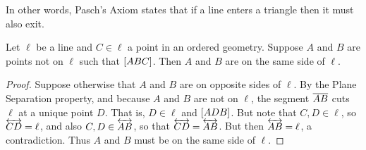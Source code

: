 In other words, Pasch's Axiom states that if a line enters a triangle then it must also exit.

\begin{lem}
Let \(\ell\) be a line and \(C \in \ell\) a point in an ordered geometry. Suppose \(A\) and \(B\) are points not on \(\ell\) such that \([ A B C ]\). Then \(A\) and \(B\) are on the same side of \(\ell\).
\end{lem}

\begin{proof}
Suppose otherwise that \(A\) and \(B\) are on opposite sides of \(\ell\). By the Plane Separation property, and because \(A\) and \(B\) are not on \(\ell\), the segment \(\overline{AB}\) cuts \(\ell\) at a unique point \(D\). That is, \(D \in \ell\) and \([ A D B ]\). But note that \(C, D \in \ell\), so \(\overleftrightarrow{CD} = \ell\), and also \(C, D \in \overleftrightarrow{AB}\), so that \(\overleftrightarrow{CD} = \overleftrightarrow{AB}\). But then \(\overleftrightarrow{AB} = \ell\), a contradiction. Thus \(A\) and \(B\) must be on the same side of \(\ell\).
\end{proof}

\Exercises%
